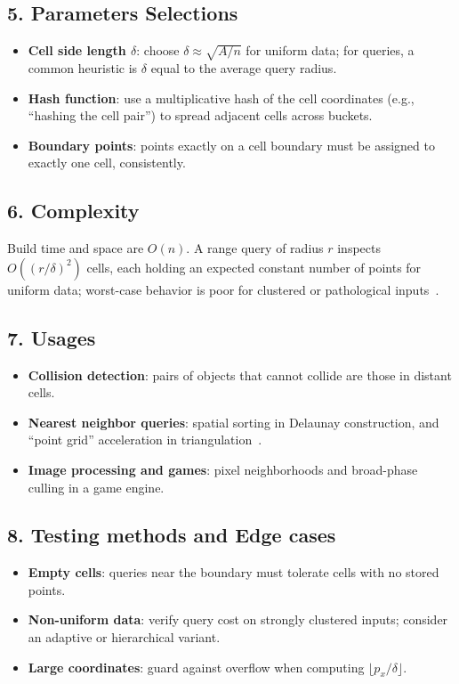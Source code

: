 \subsection{5. Parameters Selections}
\begin{itemize}
    \item \textbf{Cell side length $\delta$}: choose $\delta \approx \sqrt{A/n}$ for uniform data; for queries, a common heuristic is $\delta$ equal to the average query radius.
    \item \textbf{Hash function}: use a multiplicative hash of the cell coordinates (e.g., ``hashing the cell pair'') to spread adjacent cells across buckets.
    \item \textbf{Boundary points}: points exactly on a cell boundary must be assigned to exactly one cell, consistently.
\end{itemize}

\subsection{6. Complexity}
Build time and space are $O(n)$. A range query of radius $r$ inspects $O((r/\delta)^2)$ cells, each holding an expected constant number of points for uniform data; worst-case behavior is poor for clustered or pathological inputs~\cite{berg2008}.

\subsection{7. Usages}
\begin{itemize}
    \item \textbf{Collision detection}: pairs of objects that cannot collide are those in distant cells.
    \item \textbf{Nearest neighbor queries}: spatial sorting in Delaunay construction, and ``point grid'' acceleration in triangulation~\cite{berg2008}.
    \item \textbf{Image processing and games}: pixel neighborhoods and broad-phase culling in a game engine.
\end{itemize}

\subsection{8. Testing methods and Edge cases}
\begin{itemize}
    \item \textbf{Empty cells}: queries near the boundary must tolerate cells with no stored points.
    \item \textbf{Non-uniform data}: verify query cost on strongly clustered inputs; consider an adaptive or hierarchical variant.
    \item \textbf{Large coordinates}: guard against overflow when computing $\lfloor p_x/\delta \rfloor$.
\end{itemize}

